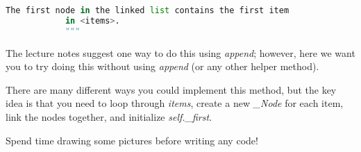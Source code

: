 \documentclass[12pt]{article}
\begin{document}
\begin{enumerate}[1.]
\begin{lstlisting}[language=python]
            The first node in the linked list contains the first item
            in <items>.
            """
    \end{lstlisting}

    \bigskip

    The lecture notes suggest one way to do this using \textit{append}; however,
    here we want you to try doing this without using \textit{append} (or any other helper
    method).

    \bigskip

    There are many different ways you could implement this method, but the key idea
    is that you need to loop through \textit{items}, create a new \textit{\_Node} for each
    item, link the nodes together, and initialize \textit{self.\_first}.

    \bigskip

    Spend time drawing some pictures before writing any code!

\end{enumerate}
\end{document}
